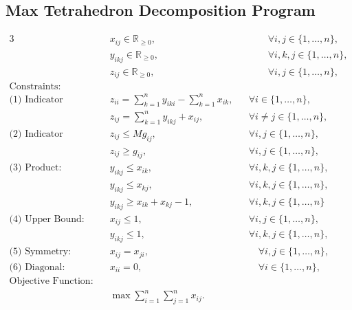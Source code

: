 \documentclass[11pt]{article}
\begin{document}
\subsection{Max Tetrahedron Decomposition Program} \label{subsec::max_TD_program}

\begin{alignat}{3}
& x_{ij} \in  \mathbb{R}_{\geq 0}, 
&&\qquad \forall i,j \in \{1, \dots, n\}, \label{eq::max_TD_x_variable} \\
& y_{ikj} \in \mathbb{R}_{\geq 0}, 
&&\qquad \forall i,k,j \in \{1, \dots, n\}, \label{eq::max_TD_y_variable} \\
& z_{ij} \in \mathbb{R}_{\geq 0}, 
&&\qquad \forall i,j \in \{1, \dots, n\}, \label{eq::max_TD_z_variable} \\
\text{Constraints: } & \nonumber \\
\text{(1) Indicator argument: } 
& z_{ii} = \sum_{k = 1}^{n}y_{iki} - \sum_{k = 1}^{n} x_{ik}, 
&& \forall i \in \{1, \dots, n\} , \label{eq::max_TD_fund_matrix} \\
& z_{ij} = \sum_{k = 1}^{n}y_{ikj} + x_{ij}, 
&& \forall i \neq j \in \{1, \dots, n\} , \label{eq::max_TD_indicator_arg} \\
\text{(2) Indicator function: } 
& z_{ij} \leq M g_{ij}, 
&& \forall i, j \in \{1, \dots, n\}, \label{eq::max_TD_indicator_upper} \\
& z_{ij} \geq g_{ij}, 
&& \forall i, j \in \{1, \dots, n\}, \label{eq::max_TD_indicator_lower}\\
\text{(3) Product: } 
& y_{ikj} \leq x_{ik}, 
&& \forall i, k, j \in \{1, \dots, n\}, \label{eq::max_TD_product_upper_first} \\
& y_{ikj} \leq x_{kj}, 
&& \forall i, k, j \in \{1, \dots, n\}, \label{eq::max_TD_product_upper_second} \\
& y_{ikj} \geq x_{ik} + x_{kj} - 1, 
&& \forall i, k, j \in \{1, \dots, n\} \label{eq::max_TD_product_lower} \\
\text{(4) Upper Bound: } 
& x_{ij} \leq 1, 
&& \forall i, j \in \{1, \dots, n\}, \label{eq::max_TD_x_upper_bound} \\
& y_{ikj} \leq 1, 
&& \forall i, k, j \in \{1, \dots, n\}, \label{eq::max_TD_y_upper_bound} \\
\text{(5) Symmetry: } 
& x_{ij} = x_{ji}, 
&&\quad \forall i,j \in \{1, \dots, n\}, \label{eq::max_TD_symmetry_x} \\
\text{(6) Diagonal: } 
& x_{ii} = 0, 
&&\quad \forall i \in \{1, \dots, n\},  \label{eq::max_TD_diagonal_x} \\
\text{Objective Function: } & \nonumber \\ 
& \max \sum_{i=1}^{n} \sum_{j=1}^{n} x_{ij}. \label{eq::max_TD_objective_funtion}
\end{alignat} \label{eq::max_TD_program}
\end{document}
